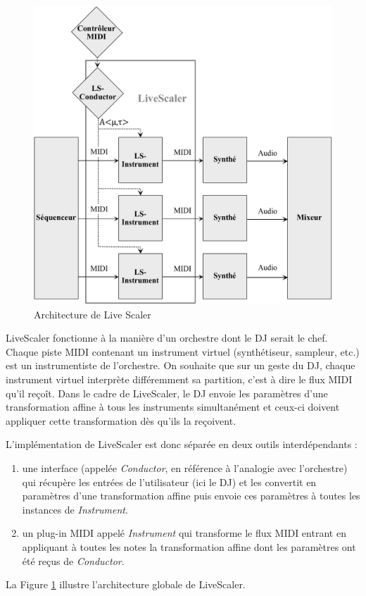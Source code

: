 \documentclass{article}
\begin{document}
\begin{figure}[htbp]
  \centering
	\includegraphics[width=\columnwidth]{architecture-LS-fr.pdf}
  \caption{Architecture de Live Scaler\label{fig:archi}}
\end{figure}

LiveScaler fonctionne à la manière d'un orchestre dont le  DJ serait le chef. Chaque piste MIDI contenant un instrument virtuel (synthétiseur, sampleur, etc.) est un instrumentiste de l'orchestre. On souhaite que sur un geste du DJ, chaque instrument virtuel interprète différemment sa partition, c'est à dire le flux MIDI qu'il reçoît. Dans le cadre de LiveScaler, le DJ envoie les paramètres d'une transformation affine à tous les instruments simultanément et ceux-ci doivent appliquer cette transformation dès qu'ils la reçoivent.

L'implémentation de LiveScaler est donc séparée en deux outils interdépendants :
\begin{enumerate}
  \item une interface (appelée \emph{Conductor}, en référence à l'analogie avec l'orchestre) qui récupère les entrées de l'utilisateur (ici le DJ) et les convertit en paramètres d'une transformation affine puis envoie ces paramètres à toutes les instances de \emph{Instrument}.
  \item un plug-in MIDI appelé \emph{Instrument} qui transforme le flux MIDI entrant en appliquant à toutes les notes la transformation affine dont les paramètres ont été reçus de \emph{Conductor}.
\end{enumerate}
La Figure \ref{fig:archi} illustre l'architecture globale de LiveScaler.
\end{document}
